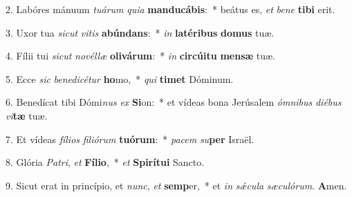 2. Labóres mánuum \textit{tuárum} \textit{quia} \textbf{manducábis}:~* beátus es, \textit{et} \textit{be}\textit{ne} \textbf{tibi} erit.

3. Uxor tua \textit{sicut} \textit{vitis} \textbf{abúndans}:~* \textit{in} \textbf{latéribus} \textbf{domus} tuæ.

4. Fílii tui \textit{sicut} \textit{novéllæ} \textbf{olivárum}:~* \textit{in} \textbf{circúitu} \textbf{mensæ} tuæ.

5. Ecce \textit{sic} \textit{benedicétur} \textbf{ho}mo,~* \textit{qui} \textbf{timet} Dóminum.

6. Benedícat tibi Dómi\textit{nus} \textit{ex} \textbf{Si}on:~* et vídeas bona Jerúsalem \textit{ómnibus} \textit{diébus} \textit{vi}\textbf{tæ} tuæ.

7. Et vídeas \textit{fílios} \textit{filiórum} \textbf{tuórum}:~* \textit{pa}\textit{cem} \textit{su}\textbf{per} Israël.

8. Glória \textit{Patri}, \textit{et} \textbf{Fílio},~* \textit{et} \textbf{Spirítu}\textbf{i} Sancto.

9. Sicut erat in princípio, et \textit{nunc}, \textit{et} \textbf{semp}er,~* et \textit{in} \textit{sǽcula} \textit{sæculórum}. \textbf{A}men.